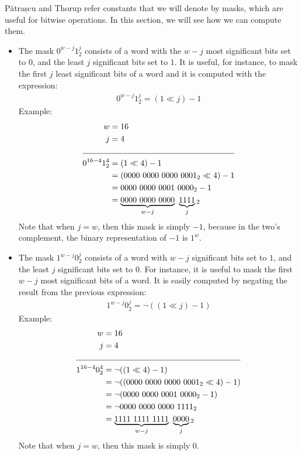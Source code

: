 Pătrașcu and Thorup refer constants that we will denote by masks, which are useful for bitwise operations. In this section, we will see how we can compute them.

\begin{itemize}
    \item
    The mask $0^{w-j} 1^j_2$ consists of a word with the $w-j$ most significant bits set to $0$, and the least $j$ significant bits set to $1$. It is useful, for instance, to mask the first $j$ least significant bits of a word and it is computed with the expression:
    \begin{align*}
        0^{w-j} 1^j_2 = (1 \ll j) - 1
    \end{align*}
    Example:
    \begin{align*}
        w &= 16\\
        j &= 4\\
        \cline{1-2}
        0^{16-4} 1^4_2 &= (1 \ll 4) - 1\\
        &= (0000\ 0000\ 0000\ 0001_2 \ll 4) - 1\\
        &= 0000\ 0000\ 0001\ 0000_2 - 1\\
        &= \underbrace{0000\ 0000\ 0000}_{w-j}\ \underbrace{1111}_{j}{}_2
    \end{align*}
    Note that when $j = w$, then this mask is simply $-1$, because in the two's complement, the binary representation of $-1$ is $1^w$.
    
    \item
    The mask $1^{w-j} 0^j_2$ consists of a word with $w-j$ significant bits set to $1$, and the least $j$ significant bits set to $0$. For instance, it is useful to mask the first $w - j$ most significant bits of a word. It is easily computed by negating the result from the previous expression:
    \begin{align*}
        1^{w-j} 0^j_2= \neg((1 \ll j) - 1)
    \end{align*}
    Example:
    \begin{align*}
        w &= 16\\
        j &= 4\\
        \cline{1-2}
        1^{16-4} 0^4_2 &= \neg((1 \ll 4) - 1)\\
        &= \neg((0000\ 0000\ 0000\ 0001_2 \ll 4) - 1)\\
        &= \neg(0000\ 0000\ 0001\ 0000_2 - 1)\\
        &= \neg0000\ 0000\ 0000\ 1111_2\\
        &= \underbrace{1111\ 1111\ 1111}_{w-j}\ \underbrace{0000}_{j}{}_2
    \end{align*}
    Note that when $j = w$, then this mask is simply $0$.
\end{itemize}

